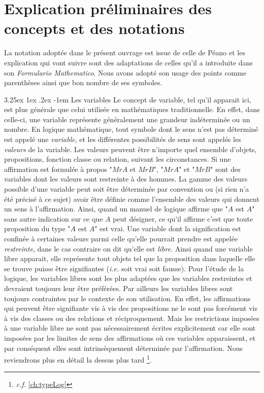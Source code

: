 \documentclass[a4paper]{book}
\makeatletter
\renewcommand\paragraph{\@startsection{paragraph}{5}{\z@}%
  {3.25ex \@plus1ex \@minus.2ex}%
  {-1em}%
  {\normalfont\normalsize\bfseries}}
\makeatother
\begin{document}
\chapter{Explication préliminaires des concepts et des notations}
La notation adoptée dans le présent ouvrage est issue de celle de Péano et les explication qui vont suivre sont des adaptations de celles qu'il a introduite dans son \textit{Formulario Mathematico}. Nous avons adopté son usage des points comme parenthèses ainsi que bon nombre de ses symboles. 

\paragraph{Les variables} Le concept de variable, tel qu'il apparait ici, est plus générale que celui utilisée en mathématiques traditionnelle. En effet, dans celle-ci, une variable représente généralement une grandeur indéterminée ou un nombre. En logique mathématique, tout symbole dont le sens n'est pas déterminé est appelé une \textit{variable}, et les différentes possibilités de sens sont appelés les \textit{valeurs} de la variable. Les valeurs peuvent être n'importe quel ensemble d'objets, propositions, fonction classe ou relation, suivant les circonstances. Si une affirmation est formulée à propos "$Mr A$ et $Mr B$", "$Mr A$" et "$Mr B$" sont des variables dont les valeurs sont restreinte à des hommes. La gamme des valeurs possible d'une variable peut soit être déterminée par convention ou (si rien n'a été précisé à ce sujet) avoir être définie comme l'ensemble des valeurs qui donnent un sens à l'affirmation. Ainsi, quand un manuel de logique affirme que "$A$ est $A$" sans autre indication sur ce que $A$ peut désigner, ce qu'il affirme c'est que toute proposition du type "$A$ est $A$" est vrai. Une variable dont la signification est confinée à certaines valeurs parmi celle qu'elle pourrait prendre est appelée \textit{restreinte}, dans le cas contraire on dit qu'elle est \textit{libre}. Ainsi quand une variable libre apparait, elle représente tout objets tel que la proposition dans laquelle elle se trouve puisse être signifiantes (\textit{i.e.} soit vrai soit fausse). Pour l'étude de la logique, les variables libres sont les plus adaptées que les variables restreintes et devraient toujours leur être préférées. Par ailleurs les variables libres sont toujours contraintes par le contexte de son utilisation. En effet, les affirmations qui peuvent être signifiante vis à vis des propositions ne le sont pas forcément vis à vis des classes ou des relations et réciproquement. Mais les restrictions imposées à une variable libre ne sont pas nécessairement écrites explicitement car elle sont imposées par les limites de sens des affirmations où ces variables apparaissent, et par conséquent elles sont intrinsèquement déterminée par l'affirmation. Nous reviendrons plus en détail la dessus plus tard \footnote{\textit{c.f.} \ref{ch:typeLog}}.
\end{document}
